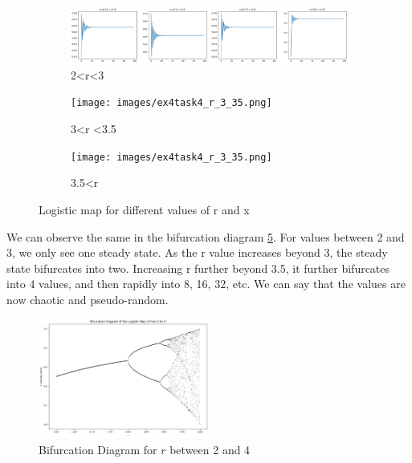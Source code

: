 \begin{itemize}
\begin{figure}[H]
    \centering
    \begin{subfigure}[b]{0.7\textwidth}
        \centering
        \includegraphics[width=\textwidth]{images/ex4task4_r_2_3.png}
        \caption{2\textless r\textless 3}
        \label{fig:r_2_3}
    \end{subfigure}
    \hfill
    \begin{subfigure}[b]{0.7\textwidth}
        \centering
        \texttt{[image: images/ex4task4\_r\_3\_35.png]}
        \caption{3\textless r \textless3.5}
        \label{fig:r_3_35}
    \end{subfigure}
        \begin{subfigure}[b]{0.7\textwidth}
        \centering
        \texttt{[image: images/ex4task4\_r\_3\_35.png]}
        \caption{3.5\textless r}
        \label{fig:r_35}
    \end{subfigure}
    \caption{Logistic map for different values of r and x}
    \label{fig:Logistic_map_2_4}
\end{figure}

We can observe the same in the bifurcation diagram \ref{fig:bifurcation_2_4}. For values between 2 and 3, we only see one steady state. As the r value increases beyond 3, the steady state bifurcates into two. Increasing r further beyond 3.5, it further bifurcates into 4 values, and then rapidly into 8, 16, 32, etc. We can say that the values are now chaotic and pseudo-random.

\begin{figure} [H]
    \centering
    \includegraphics[width=0.5\textwidth]{images/ex4task4_bifurcation_2_4.png}
    \caption{Bifurcation Diagram for $r$ between 2 and 4}
    \label{fig:bifurcation_2_4}
\end{figure}


\end{itemize}
